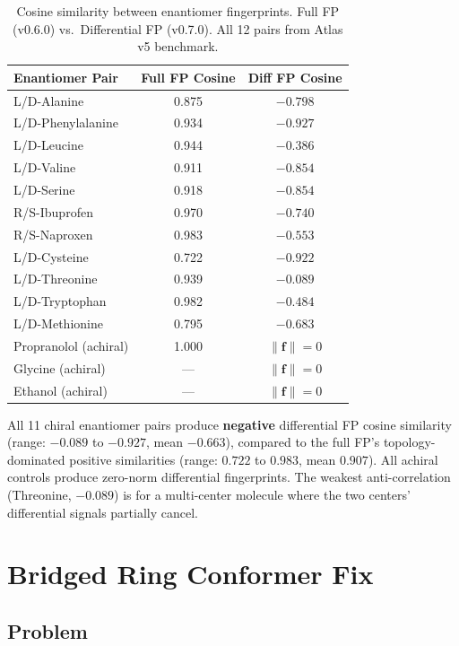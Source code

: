 \documentclass[11pt,a4paper]{article}
\begin{document}
\begin{table}[H]
\centering
\caption{Cosine similarity between enantiomer fingerprints. Full FP (v0.6.0) vs.\ Differential FP (v0.7.0). All 12 pairs from Atlas v5 benchmark.}
\label{tab:cosine}
\begin{tabular}{lcc}
\toprule
\textbf{Enantiomer Pair} & \textbf{Full FP Cosine} & \textbf{Diff FP Cosine} \\
\midrule
L/D-Alanine & 0.875 & $-0.798$ \\
L/D-Phenylalanine & 0.934 & $-0.927$ \\
L/D-Leucine & 0.944 & $-0.386$ \\
L/D-Valine & 0.911 & $-0.854$ \\
L/D-Serine & 0.918 & $-0.854$ \\
R/S-Ibuprofen & 0.970 & $-0.740$ \\
R/S-Naproxen & 0.983 & $-0.553$ \\
L/D-Cysteine & 0.722 & $-0.922$ \\
L/D-Threonine & 0.939 & $-0.089$ \\
L/D-Tryptophan & 0.982 & $-0.484$ \\
L/D-Methionine & 0.795 & $-0.683$ \\
\midrule
Propranolol (achiral) & 1.000 & $\|\mathbf{f}\| = 0$ \\
Glycine (achiral) & --- & $\|\mathbf{f}\| = 0$ \\
Ethanol (achiral) & --- & $\|\mathbf{f}\| = 0$ \\
\bottomrule
\end{tabular}
\end{table}

\begin{financialbox}
All 11 chiral enantiomer pairs produce \textbf{negative} differential FP cosine similarity (range: $-0.089$ to $-0.927$, mean $-0.663$), compared to the full FP's topology-dominated positive similarities (range: $0.722$ to $0.983$, mean $0.907$). All achiral controls produce zero-norm differential fingerprints. The weakest anti-correlation (Threonine, $-0.089$) is for a multi-center molecule where the two centers' differential signals partially cancel.
\end{financialbox}

\section{Bridged Ring Conformer Fix}
\label{sec:bridged}

\subsection{Problem}
\end{document}
